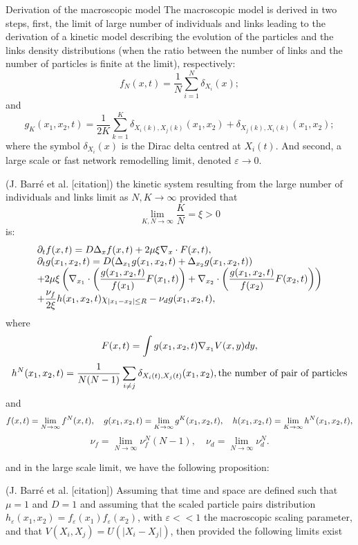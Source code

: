	\begin{paragraph}{Derivation of the macroscopic model}
	The macroscopic model is derived in two steps, first, the limit of large number of individuals and links leading to the derivation of a kinetic model describing the evolution of the particles and the links density distributions (when the ratio between the number of links and the number of particles is finite at the limit), respectively:  
	$$ f_N(x,t) = \dfrac{1}{N} \sum_{i=1}^{N} \delta_{X_i}(x);$$
and 
    $$ g_K(x_1,x_2,t) = \dfrac{1}{2K} \sum_{k=1}^{K} \delta_{X_i(k), X_j(k)}(x_1, x_2) + \delta_{X_j(k), X_i(k)}(x_1, x_2);$$
where the symbol $ \delta_{X_i}(x)$ is the Dirac delta centred at $X_i(t)$. And second, a large scale or fast network remodelling limit, denoted $\varepsilon \rightarrow 0$.

\begin{theo}(J. Barré et al. [citation])
	the kinetic system resulting from the large number of individuals and links limit as $N, K \rightarrow \infty$ provided that 
$$ \lim_{K, N \rightarrow \infty} \dfrac{K}{N} = \xi > 0$$	
is:
	\begin{equation}
	\begin{array}{l}
	{\partial}_t f(x,t)  = D \Delta_x f(x,t) + 2\mu\xi \nabla_x \cdot F(x,t),\\
	{\partial}_t {g(x_1, x_2, t) } =  D (\Delta_{x_1} {g(x_1, x_2, t) }  + \Delta_{x_2} {g(x_1, x_2, t) })  \\
	+ 2\mu\xi \left( \nabla_{x_1} \cdot \left( \dfrac{{g(x_1, x_2, t) }}{f(x_1)} F(x_1, t)\right) + \nabla_{x_2} \cdot \left( \dfrac{{g(x_1, x_2, t) }}{f(x_2)} F(x_2, t)\right) \right) \\
	+ \dfrac{\nu_f}{2 \xi} h(x_1, x_2, t) \chi _{\vert x_1 - x_2 \vert \leq R} - \nu_d {g(x_1, x_2, t) },
	\end{array}
	\end{equation}
	where 
	$$ F(x,t) = \int {g(x_1, x_2, t) } \nabla_{x_1} V(x,y) dy,$$
	$$ {h^{N}(x_1, x_2, t)} = \dfrac{1}{N(N-1)} \sum_{i\neq j} \delta_{X_i(t), X_j(t)}(x_1,x_2), \text{the number of pair of particles}$$
	and 
	$$f(x,t) = \lim_{N \rightarrow \infty} f^{N}(x,t),\quad {g(x_1, x_2, t) } = \lim_{K \rightarrow \infty} {g^{K}(x_1, x_2, t)}, \quad {h(x_1, x_2, t) } = \lim_{K \rightarrow \infty} {h^{N}(x_1, x_2, t)}, $$
	$$ \nu_f = \lim_{N \rightarrow \infty} \nu_f^N (N-1), \quad \nu_d = \lim_{N \rightarrow \infty} \nu_d^{N}. $$
\end{theo}
and in the large scale limit, we have the following proposition: 
\begin{prop}(J. Barré et al. [citation])
Assuming that time and space are defined such that $\mu = 1$ and $D = 1$ and assuming that the scaled particle pairs distribution $h_{\varepsilon}(x_1, x_2) = f_{\varepsilon}(x_1)f_{\varepsilon}(x_2)$, with $\varepsilon << 1$ the macroscopic scaling parameter, and that $V(X_i, X_j) = U(\vert X_i - X_j \vert)$, then provided the following limits exist 

\end{prop}
\end{paragraph}
